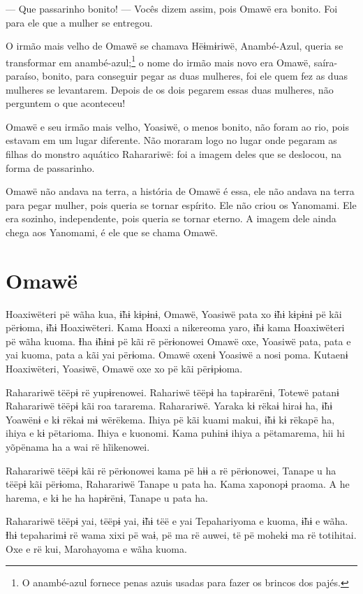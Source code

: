 --- Que passarinho bonito! --- Vocês dizem assim, pois Omawë era bonito.
Foi para ele que a mulher se entregou. 

O irmão mais velho de Omawë se chamava Hëɨmɨriwë, Anambé-Azul, queria se transformar em
anambé-azul;\footnote{O anambé-azul fornece penas azuis usadas para fazer os brincos dos
pajés.} o nome do irmão mais novo era Omawë,
saíra-paraíso, bonito, para conseguir pegar as duas mulheres, foi ele
quem fez as duas mulheres se levantarem. Depois de os dois pegarem essas
duas mulheres, não perguntem o que aconteceu! 

Omawë e seu irmão mais velho, Yoasiwë, o menos bonito, não foram ao rio,
pois estavam em um lugar diferente. Não moraram logo no lugar onde
pegaram as filhas do monstro aquático Raharariwë: foi a imagem deles que
se deslocou, na forma de passarinho.

Omawë não andava na terra, a história de Omawë é essa, ele não
andava na terra para pegar mulher, pois queria se tornar espírito. Ele
não criou os Yanomami. Ele era sozinho, independente, pois queria se
tornar eterno. A imagem dele ainda chega aos Yanomami, é ele que se
chama Omawë.

\chapter{Omawë}

 Hoaxiwëteri pë wãha kua, ɨ̃hɨ kɨpɨnɨ, Omawë, Yoasiwë pata xo ɨ̃hɨ
kɨpɨnɨ pë kãi përɨoma, ɨ̃hɨ Hoaxiwëteri. Kama Hoaxi a nikereoma yaro, ɨ̃hɨ
kama Hoaxiwëteri pë wãha kuoma. Ɨha ɨ̃hɨnɨ pë kãi rë përɨonowei Omawë
oxe, Yoasiwë pata, pata e yai kuoma, pata a kãi yai përɨoma. Omawë oxenɨ
Yoasiwë a nosi poma. Kutaenɨ Hoaxiwëteri, Yoasiwë, Omawë oxe xo pë kãi
përɨpɨoma. 

Raharariwë tëëpɨ rë yupɨrenowei. Rahariwë tëëpɨ ha tapɨrarënɨ, Totewë
patanɨ Raharariwë tëëpɨ kãi roa tararema. Raharariwë. Yaraka kɨ rëkaɨ
hiraɨ ha, ɨ̃hɨ Yoawënɨ e kɨ rëkaɨ mɨ wërëkema. Ihiya pë kãi kuami makui,
ɨ̃hɨ kɨ rëkapë ha, ihiya e kɨ pëtarioma. Ihiya e kuonomi. Kama puhinɨ
ihiya a pëtamarema, hii hi yõpënama ha a wai rë hĩikenowei. 

Raharariwë tëëpɨ kãi rë përɨonowei kama pë hɨɨ a rë përɨonowei, Tanape u
ha tëëpɨ kãi përɨoma, Raharariwë Tanape u pata ha. Kama xaponopɨ praoma.
A he harema, e kɨ he ha hapɨrënɨ, Tanape u pata ha. 

Raharariwë tëëpɨ yai, tëëpɨ yai, ɨ̃hɨ tëë e yai Tepahariyoma e kuoma, ɨ̃hɨ
e wãha. Ɨhɨ tepaharimɨ rë wama xixi pë waɨ, pë ma rë auwei, të pë mohekɨ
ma rë totihitai. Oxe e rë kui, Marohayoma e wãha kuoma. 

